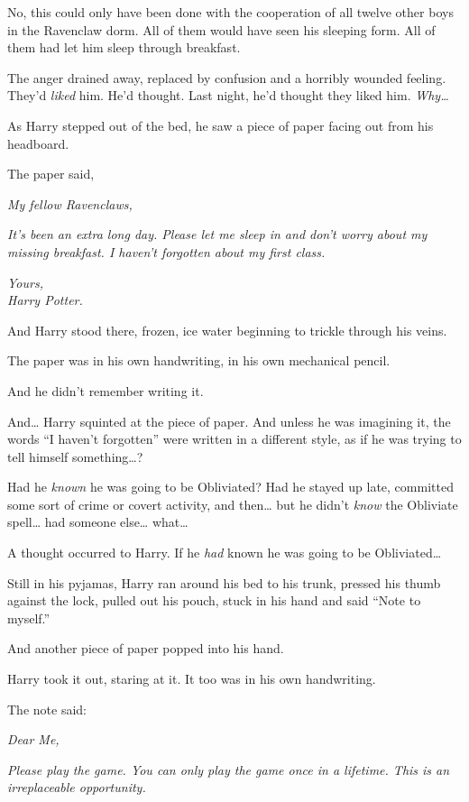No, this could only have been done with the cooperation of all twelve
other boys in the Ravenclaw dorm. All of them would have seen his
sleeping form. All of them had let him sleep through breakfast.

The anger drained away, replaced by confusion and a horribly wounded
feeling. They'd \emph{liked} him. He'd thought. Last night, he'd thought
they liked him. \emph{Why\ldots{}}

As Harry stepped out of the bed, he saw a piece of paper facing out from
his headboard.

The paper said,

\emph{My fellow Ravenclaws,}

\emph{It's been an extra long day. Please let me sleep in and don't
worry about my missing breakfast. I haven't forgotten about my first
class.}

\emph{Yours,}\\\emph{Harry Potter.}

And Harry stood there, frozen, ice water beginning to trickle through
his veins.

The paper was in his own handwriting, in his own mechanical pencil.

And he didn't remember writing it.

And\ldots{} Harry squinted at the piece of paper. And unless he was
imagining it, the words ``I haven't forgotten'' were written in a
different style, as if he was trying to tell himself something\ldots{}?

Had he \emph{known} he was going to be Obliviated? Had he stayed up
late, committed some sort of crime or covert activity, and then\ldots{}
but he didn't \emph{know} the Obliviate spell\ldots{} had someone
else\ldots{} what\ldots{}

A thought occurred to Harry. If he \emph{had} known he was going to be
Obliviated\ldots{}

Still in his pyjamas, Harry ran around his bed to his trunk, pressed his
thumb against the lock, pulled out his pouch, stuck in his hand and said
``Note to myself.''

And another piece of paper popped into his hand.

Harry took it out, staring at it. It too was in his own handwriting.

The note said:

\emph{Dear Me,}

\emph{Please play the game. You can only play the game once in a
lifetime. This is an irreplaceable opportunity.}

